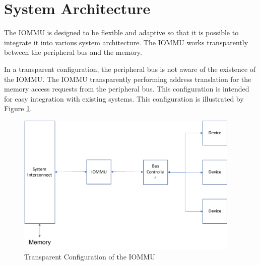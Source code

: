 \section{System Architecture}
\label{sec:sys_arch}

The IOMMU is designed to be flexible and adaptive so that it is possible to integrate it
into various system architecture. The IOMMU works transparently between the peripheral bus
and the memory.

In a transparent configuration, the peripheral bus is not aware of the existence of the
IOMMU. The IOMMU transparently performing address translation for the memory access
requests from the peripheral bus. This configuration is intended for easy integration with
existing systems. This configuration is illustrated by Figure \ref{fig:trans-conf}.

\begin{figure}[ht!]
    \centering
    \includegraphics[width=0.95\textwidth]{img/trans-conf.pdf}
    \caption{Transparent Configuration of the IOMMU}
    \label{fig:trans-conf}
\end{figure}

